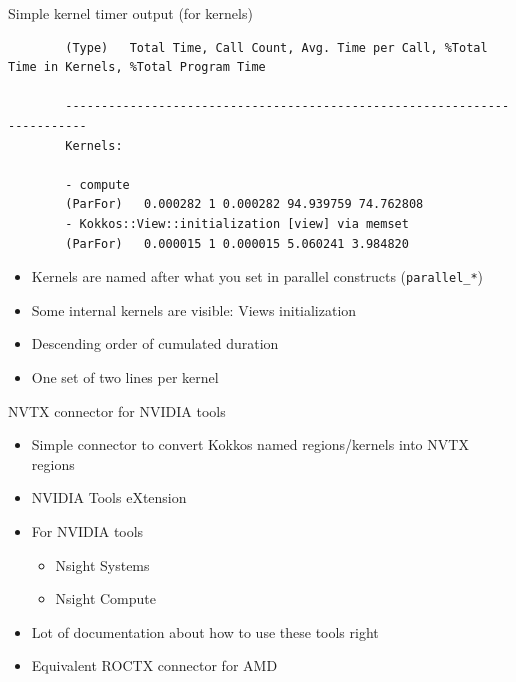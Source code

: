 \documentclass[
    aspectratio=169,
    \createHandout
]{beamer}
\begin{document}
\begin{frame}[fragile]{Simple kernel timer output (for kernels)}
    \begin{verbatim}
        (Type)   Total Time, Call Count, Avg. Time per Call, %Total Time in Kernels, %Total Program Time

        -------------------------------------------------------------------------
        Kernels:

        - compute
        (ParFor)   0.000282 1 0.000282 94.939759 74.762808
        - Kokkos::View::initialization [view] via memset
        (ParFor)   0.000015 1 0.000015 5.060241 3.984820
    \end{verbatim}

    \begin{itemize}
        \item Kernels are named after what you set in parallel constructs (\texttt{parallel\_*})
        \item Some internal kernels are visible: Views initialization
        \item Descending order of cumulated duration
        \item One set of two lines per kernel
    \end{itemize}
\end{frame}

\begin{frame}{NVTX connector for NVIDIA tools}
    \begin{itemize}
        \item Simple connector to convert Kokkos named regions/kernels into NVTX regions
        \item NVIDIA Tools eXtension
        \item For NVIDIA tools
        \begin{itemize}
            \item Nsight Systems
            \item Nsight Compute
        \end{itemize}
        \item Lot of documentation about how to use these tools right
        \item Equivalent ROCTX connector for AMD
    \end{itemize}
\end{frame}
\end{document}
